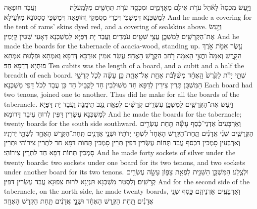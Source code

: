 {וַיַּ֤עַשׂ מִכְסֶה֙ לָאֹ֔הֶל עֹרֹ֥ת אֵילִ֖ם מְאׇדָּמִ֑ים וּמִכְסֵ֛ה עֹרֹ֥ת תְּחָשִׁ֖ים מִלְמָֽעְלָה׃ \setuma         }
{וַעֲבַד חוּפָאָה לְמַשְׁכְּנָא דְּמַשְׁכֵּי דִּכְרֵי מְסֻמְּקֵי וְחוּפָאָה דְּמַשְׁכֵּי סָסְגוֹנָא מִלְּעֵילָא׃}
{And he made a covering for the tent of rams’ skins dyed red, and a covering of sealskins above.}{}
{וַיַּ֥עַשׂ אֶת־הַקְּרָשִׁ֖ים לַמִּשְׁכָּ֑ן עֲצֵ֥י שִׁטִּ֖ים עֹמְדִֽים׃}
{וַעֲבַד יָת דַּפַּיָּא לְמַשְׁכְּנָא דְּאָעֵי שִׁטִּין קָיְמִין׃}
{And he made the boards for the tabernacle of acacia-wood, standing up.}{}
{עֶ֥שֶׂר אַמֹּ֖ת אֹ֣רֶךְ הַקָּ֑רֶשׁ וְאַמָּה֙ וַחֲצִ֣י הָֽאַמָּ֔ה רֹ֖חַב הַקֶּ֥רֶשׁ הָאֶחָֽד׃}
{עֲשַׂר אַמִּין אוּרְכָּא דְּדַפָּא וְאַמְּתָא וּפַלְגוּת אַמְּתָא פּוּתְיָא דְּדַפָּא חַד׃}
{Ten cubits was the length of a board, and a cubit and a half the breadth of each board.}{}
{שְׁתֵּ֣י יָדֹ֗ת לַקֶּ֙רֶשׁ֙ הָֽאֶחָ֔ד מְשֻׁ֨לָּבֹ֔ת אַחַ֖ת אֶל־אֶחָ֑ת כֵּ֣ן עָשָׂ֔ה לְכֹ֖ל קַרְשֵׁ֥י הַמִּשְׁכָּֽן׃}
{תְּרֵין צִירִין לְדַפָּא חַד מְשׁוּלְּבִין חַד לָקֳבֵיל חַד כֵּן עֲבַד לְכֹל דַּפֵּי מַשְׁכְּנָא׃}
{Each board had two tenons, joined one to another. Thus did he make for all the boards of the tabernacle.}{}
{וַיַּ֥עַשׂ אֶת־הַקְּרָשִׁ֖ים לַמִּשְׁכָּ֑ן עֶשְׂרִ֣ים קְרָשִׁ֔ים לִפְאַ֖ת נֶ֥גֶב תֵּימָֽנָה׃}
{וַעֲבַד יָת דַּפַּיָּא לְמַשְׁכְּנָא עֶשְׂרִין דַּפִּין לְרוּחַ עֵיבַר דָּרוֹמָא׃}
{And he made the boards for the tabernacle; twenty boards for the south side southward.}{}
{וְאַרְבָּעִים֙ אַדְנֵי־כֶ֔סֶף עָשָׂ֕ה תַּ֖חַת עֶשְׂרִ֣ים הַקְּרָשִׁ֑ים שְׁנֵ֨י אֲדָנִ֜ים תַּֽחַת־הַקֶּ֤רֶשׁ הָאֶחָד֙ לִשְׁתֵּ֣י יְדֹתָ֔יו וּשְׁנֵ֧י אֲדָנִ֛ים תַּֽחַת־הַקֶּ֥רֶשׁ הָאֶחָ֖ד לִשְׁתֵּ֥י יְדֹתָֽיו׃}
{וְאַרְבְּעִין סָמְכִין דִּכְסַף עֲבַד תְּחוֹת עֶשְׂרִין דַּפִּין תְּרֵין סָמְכִין תְּחוֹת דַּפָּא חַד לִתְרֵין צִירוֹהִי וּתְרֵין סָמְכִין תְּחוֹת דַּפָּא חַד לִתְרֵין צִירוֹהִי׃}
{And he made forty sockets of silver under the twenty boards: two sockets under one board for its two tenons, and two sockets under another board for its two tenons.}{}
{וּלְצֶ֧לַע הַמִּשְׁכָּ֛ן הַשֵּׁנִ֖ית לִפְאַ֣ת צָפ֑וֹן עָשָׂ֖ה עֶשְׂרִ֥ים קְרָשִֽׁים׃}
{וְלִסְטַר מַשְׁכְּנָא תִּנְיָנָא לְרוּחַ צִפּוּנָא עֲבַד עֶשְׂרִין דַּפִּין׃}
{And for the second side of the tabernacle, on the north side, he made twenty boards,}{}
{וְאַרְבָּעִ֥ים אַדְנֵיהֶ֖ם כָּ֑סֶף שְׁנֵ֣י אֲדָנִ֗ים תַּ֚חַת הַקֶּ֣רֶשׁ הָאֶחָ֔ד וּשְׁנֵ֣י אֲדָנִ֔ים תַּ֖חַת הַקֶּ֥רֶשׁ הָאֶחָֽד׃}
